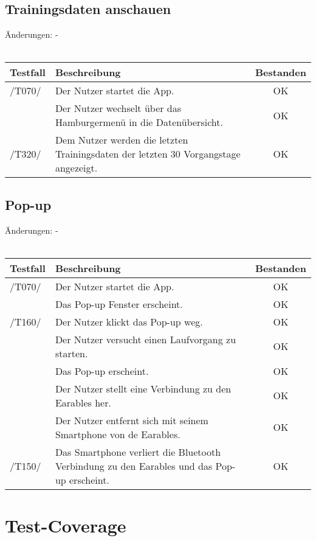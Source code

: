 \documentclass[a4paper,12pt]{article}
\newcommand{\testok}[0]{
	\cellcolor{green!25} OK
}
\begin{document}
\subsection{Trainingsdaten anschauen}
Änderungen: -
\\
\\
\begin{tabular}{ |p{1.5cm} | p{12cm} | c| }
	\hline
	\textbf{Testfall} & \textbf{Beschreibung} & \textbf{Bestanden}\\
	\hline
	/T070/ & Der Nutzer startet die App. & \testok \\
	\hline
	& Der Nutzer wechselt über das Hamburgermenü in die Datenübersicht. & \testok  \\
	\hline
	/T320/ & Dem Nutzer werden die letzten Trainingsdaten der letzten 30 Vorgangstage angezeigt. & \testok  \\
	\hline
\end{tabular}

\subsection{Pop-up}
Änderungen: -
\\
\\
\begin{tabular}{ |p{1.5cm} | p{12cm} | c| }
	\hline
	\textbf{Testfall} & \textbf{Beschreibung} & \textbf{Bestanden}\\
	\hline
	/T070/ & Der Nutzer startet die App. & \testok \\
	\hline
	& Das Pop-up Fenster erscheint. & \testok  \\
	\hline
	/T160/ & Der Nutzer klickt das Pop-up weg. & \testok  \\
	\hline
	& Der Nutzer versucht einen Laufvorgang zu starten. & \testok  \\
	\hline
	& Das Pop-up erscheint. & \testok  \\
	\hline
	& Der Nutzer stellt eine Verbindung zu den Earables her. & \testok  \\
	\hline
	& Der Nutzer entfernt sich mit seinem Smartphone von de Earables. & \testok  \\
	\hline
	/T150/ & Das Smartphone verliert die Bluetooth Verbindung zu den Earables und das Pop-up erscheint. & \testok  \\
	\hline
\end{tabular}



\section{Test-Coverage}
\end{document}
